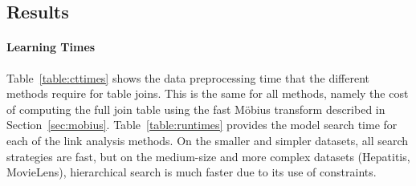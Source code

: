 \documentclass{article}
\begin{document}
%
%


\subsection{Results} 

\paragraph{Learning Times} Table~\ref{table:cttimes} shows the data preprocessing time that the different methods require for table joins. This is the same for all methods, namely the cost of computing the full join table using the fast M\"obius transform described in Section~\ref{sec:mobius}. 
Table~\ref{table:runtimes}
 provides the model search time for each of the link analysis methods. 
On the smaller and simpler datasets, all search strategies are fast, 
but on the medium-size and more complex datasets (Hepatitis, MovieLens), hierarchical search is much faster due to its use of constraints.
\end{document}

